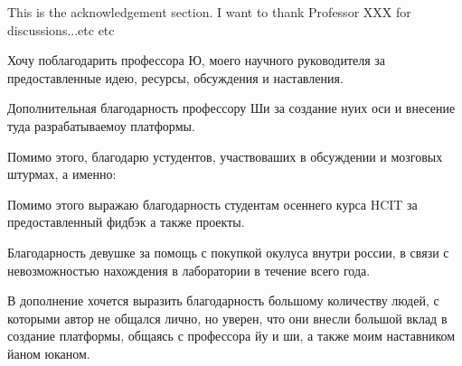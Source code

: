 \begin{acknowledgements}
  This is the acknowledgement section. I want to thank Professor XXX for discussions...etc etc
  
  Хочу поблагодарить профессора Ю, моего научного руководителя за предоставленные идею, ресурсы, обсуждения и наставления.
  
  Дополнительная благодарность профессору Ши за создание нуих оси и внесение туда разрабатываемоу платформы.
  
  Помимо этого, благодарю устудентов, участвоваших в обсуждении и мозговых штурмах, а именно:
  
  Помимо этого выражаю благодарность студентам осеннего курса HCIT за предоставленный фидбэк а также проекты.
  
  Благодарность девушке за помощь с покупкой окулуса внутри россии, в связи с невозможностью нахождения в лаборатории в течение всего года.
  
  В дополнение хочется выразить благодарность большому количеству людей, с которыми автор не общался лично, но уверен, что они внесли большой вклад в создание платформы, общаясь с профессора йу и ши, а также моим наставником йаном юканом.
  
  
  
  
  
\end{acknowledgements}
